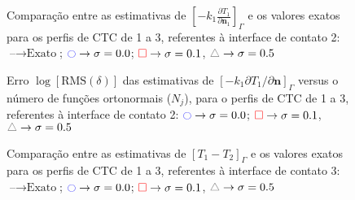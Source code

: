 \begin{figure}[h!b]
	\caption{Comparação entre as estimativas de $\left[-k_1 \frac{\partial T_1}{\partial\mathbf{n}_1}\right]_\Gamma$ e os valores exatos para os perfis de CTC de 1 a 3, referentes à interface de contato 2: $\text{--} \rightarrow \text{Exato}$; $\textcolor{blue}{\ocircle} \rightarrow \sigma = 0.0$; $\textcolor{red}{\square} \rightarrow \sigma = 0.1$, $\textcolor{gray}{\triangle} \rightarrow \sigma = 0.5$}
\end{figure}

\begin{figure}[h!b]
	\caption{Erro $\log[\text{RMS}(\delta)]$ das estimativas de $[-k_1 \partial T_1/\partial\mathbf{n}]_\Gamma$ versus o número de funções ortonormais ($N_j$), para o perfis de CTC de 1 a 3, referentes à interface de contato 2: $\textcolor{blue}{\ocircle} \rightarrow \sigma = 0.0$; $\textcolor{red}{\square} \rightarrow \sigma = 0.1$, $\textcolor{gray}{\triangle} \rightarrow \sigma = 0.5$}
\end{figure}

\begin{figure}[h!b]
\end{figure}


\begin{figure}[h!b]
	\caption{Comparação entre as estimativas de $[T_1 - T_2]_\Gamma$ e os valores exatos para os perfis de CTC de 1 a 3, referentes à interface de contato 3: $\text{--} \rightarrow \text{Exato}$; $\textcolor{blue}{\ocircle} \rightarrow \sigma = 0.0$; $\textcolor{red}{\square} \rightarrow \sigma = 0.1$, $\textcolor{gray}{\triangle} \rightarrow \sigma = 0.5$}
\end{figure}

